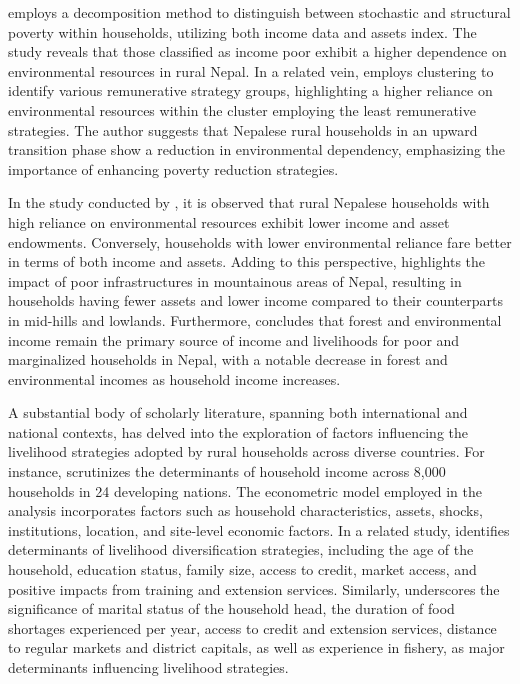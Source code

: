 \cite{charlery2015assessing} employs a decomposition method to distinguish between stochastic and structural poverty within households, utilizing both income data and assets index. The study reveals that those classified as income poor exhibit a higher dependence on environmental resources in rural Nepal. In a related vein, \cite{walelign2017dynamics} employs clustering to identify various remunerative strategy groups, highlighting a higher reliance on environmental resources within the cluster employing the least remunerative strategies. The author suggests that Nepalese rural households in an upward transition phase show a reduction in environmental dependency, emphasizing the importance of enhancing poverty reduction strategies.\par

In the study conducted by \cite{walelign2020environmental}, it is observed that rural Nepalese households with high reliance on environmental resources exhibit lower income and asset endowments. Conversely, households with lower environmental reliance fare better in terms of both income and assets. Adding to this perspective, \cite{walelign2021poverty} highlights the impact of poor infrastructures in mountainous areas of Nepal, resulting in households having fewer assets and lower income compared to their counterparts in mid-hills and lowlands. Furthermore, \cite{chhetri2022importance} concludes that forest and environmental income remain the primary source of income and livelihoods for poor and marginalized households in Nepal, with a notable decrease in forest and environmental incomes as household income increases.\par

A substantial body of scholarly literature, spanning both international and national contexts, has delved into the exploration of factors influencing the livelihood strategies adopted by rural households across diverse countries. For instance, \cite{angelsen2014environmental} scrutinizes the determinants of household income across 8,000 households in 24 developing nations. The econometric model employed in the analysis incorporates factors such as household characteristics, assets, shocks, institutions, location, and site-level economic factors. In a related study, \cite{emeru2022determinants} identifies determinants of livelihood diversification strategies, including the age of the household, education status, family size, access to credit, market access, and positive impacts from training and extension services. Similarly, \cite{amevenku2019determinants} underscores the significance of marital status of the household head, the duration of food shortages experienced per year, access to credit and extension services, distance to regular markets and district capitals, as well as experience in fishery, as major determinants influencing livelihood strategies.\par

